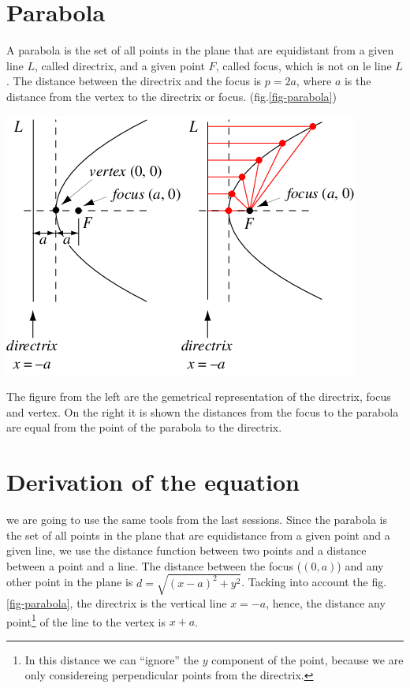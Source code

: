 \documentclass[../main-notes.tex]{subfiles}
\begin{document}
\section{Parabola}

A parabola is the set of all points in the plane that are equidistant from a given line $L$, called directrix, and a given point $F$, called focus, which is not on le line $L$.
The distance between the directrix and the focus is $p=2a$, where $a$ is the distance from the vertex to the directrix or focus. (fig.\ref{fig-parabola})
\begin{marginfigure}
    \centering
    \includegraphics[width=\textwidth]{../Figures/parabola/ParabolaDirectrix_1001.png}
    \caption{The figure from the left are the gemetrical representation of the directrix, focus and vertex. On the right it is shown the distances from the focus to the parabola are equal from the point of the parabola to the directrix.}\label{fig-parabola}
\end{marginfigure}

\section{Derivation of the equation}

we are going to use the same tools from the last sessions.
Since the parabola is the set of all points in the plane that are equidistance from a given point and a given line, we use the distance function between two points and a distance between a point and a line.
The distance between the focus ($(0,a)$) and any other point in the plane is $d=\sqrt{(x-a)^2 + y^2}$.
Tacking into account the fig.\ref{fig-parabola}, the directrix is the vertical line $x=-a$, hence, the distance any point\footnote{In this distance we can ``ignore'' the $y$ component of the point, because we are only considereing perpendicular points from the directrix.} of the line to the vertex is $x+a$.
\end{document}
